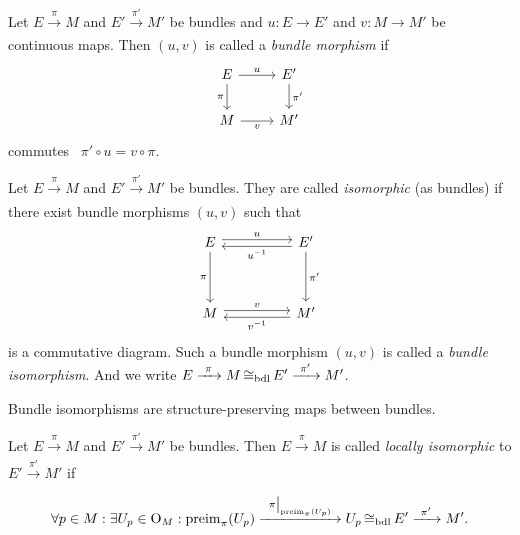 \begin{definition}\label{def:bundle-morphism}
	Let \(E \xrightarrow[]{\ \pi\ } M\) and \(E' \xrightarrow[]{\ \pi'\ } M'\) be bundles and \(u: E \to E'\) and \(v: M \to M'\) be continuous maps. Then \((u, v)\) is called a \emph{bundle morphism} if
	\begin{equation}
		\begin{tikzcd}
			E \arrow[r, "u"] \arrow[d, "\pi"'] & E' \arrow[d, "\pi'"] \\
			M \arrow[r, "v"']                  & M'
		\end{tikzcd}
	\end{equation}
	commutes \ie\ \(\pi' \circ u = v \circ \pi\).
\end{definition}

\begin{definition}\label{def:bundle-isomorphism}
	Let \(E \xrightarrow[]{\ \pi\ } M\) and \(E' \xrightarrow[]{\ \pi'\ } M'\) be bundles. They are called \emph{isomorphic} (as bundles) if there exist bundle morphisms \((u, v)\) such that
	\begin{equation}
		\begin{tikzcd}
			E \arrow[rr,shift left,"u"] \arrow[dd,"\pi"'] & & E' \arrow[ll,shift left,"u^{-1}"] \arrow[dd,"\pi'"] \\
			& & \\
			M \arrow[rr,shift left,"v"] & & M' \arrow[ll,shift left,"v^{-1}"]
		\end{tikzcd}
	\end{equation}
	is a commutative diagram. Such a bundle morphism \((u, v)\) is called a \emph{bundle isomorphism}. And we write \(E \xrightarrow[]{\ \pi\ } M \operatorname{\mathrel{\cong_{\text{bdl}}}} E' \xrightarrow[]{\ \pi'\ } M'\).
\end{definition}

Bundle isomorphisms are structure-preserving maps between bundles.

\begin{definition}
	Let \(E \xrightarrow[]{\ \pi\ } M\) and \(E' \xrightarrow[]{\ \pi'\ } M'\) be bundles. Then \(E \xrightarrow[]{\ \pi\ } M\) is called \emph{locally isomorphic} to \(E' \xrightarrow[]{\ \pi'\ } M'\) if
	\begin{equation}
		\forall p \in M: \exists U_p \in \O_M: \preimg_{\pi}(U_p) \xrightarrow[]{\ \eval{\pi}_{\preimg_{\pi}(U_p)}\ } U_p \bdlIso E' \xrightarrow[]{\ \pi'\ } M'.
	\end{equation}
\end{definition}

